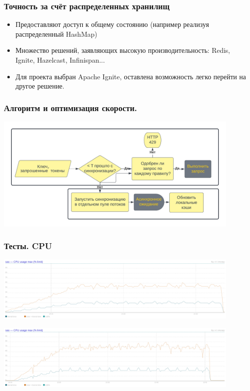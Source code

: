 \documentclass[14pt,aspectratio=169,hyperref={pdftex,unicode},xcolor=dvipsnames]{beamer}
\begin{document}
\begin{frame}
\frametitle{Точность за счёт распределенных хранилищ}
\begin{itemize}
\item Предоставляют доступ к общему состоянию (например реализуя распределенный HashMap)
\item Множество решений, заявляющих высокую производительность: Redis, Ignite, Hazelcast, Infinispan...
\item Для проекта выбран Apache Ignite, оставлена возможность легко перейти на другое решение.
\end{itemize}
\end{frame}

\begin{frame}
\frametitle{Алгоритм и оптимизация скорости.}
\begin{center}
\includegraphics[width=12cm]{images/algoRu.png}
\end{center}
\end{frame}

\begin{frame}
\frametitle{Тесты. CPU}
\begin{center}
\includegraphics[width=12cm]{images/cpuOff.png}


\includegraphics[width=12cm]{images/cpuOn.png}
\end{center}
\end{frame}
\end{document}
